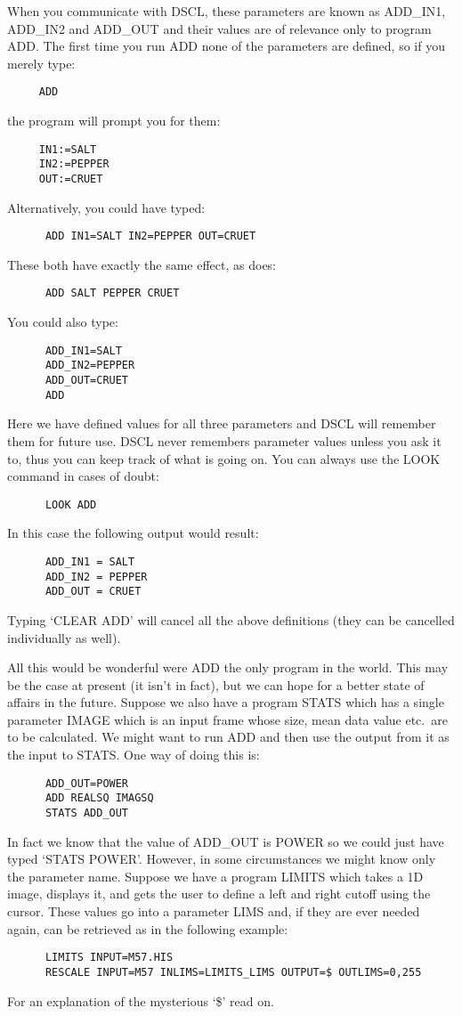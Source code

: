 When you communicate with DSCL, these parameters are known as ADD\_IN1, ADD\_IN2
and ADD\_OUT and their values are of relevance only to program ADD.
The first time you run ADD none of the parameters are defined, so if you
merely type:
\begin{verbatim}
     ADD
\end{verbatim}
the program will prompt you for them:
\begin{verbatim}
     IN1:=SALT
     IN2:=PEPPER
     OUT:=CRUET
\end{verbatim}
Alternatively, you could have typed:
\begin{verbatim}
      ADD IN1=SALT IN2=PEPPER OUT=CRUET
\end{verbatim}
These both have exactly the same effect, as does:
\begin{verbatim}
      ADD SALT PEPPER CRUET
\end{verbatim}
You could also type:
\begin{verbatim}
      ADD_IN1=SALT
      ADD_IN2=PEPPER
      ADD_OUT=CRUET
      ADD
\end{verbatim}
Here we have defined values for all three parameters and DSCL will remember
them for future use.
DSCL never remembers parameter values unless you ask it to, thus you can keep
track of what is going on.
You can always use the LOOK command in cases of doubt:
\begin{verbatim}
      LOOK ADD
\end{verbatim}
In this case the following output would result:
\begin{verbatim}
      ADD_IN1 = SALT
      ADD_IN2 = PEPPER
      ADD_OUT = CRUET
\end{verbatim}
Typing `CLEAR ADD' will cancel all the above definitions (they can be cancelled
individually as well).

All this would be wonderful were ADD the only program in the world.
This may be the case at present (it isn't in fact), but we can hope for a
better state of affairs in the future.
Suppose we also have a program STATS which has a single parameter IMAGE which
is an input frame whose size, mean data value etc.\ are to be calculated.
We might want to run ADD and then use the output from it as the input to STATS.
One way of doing this is:
\begin{verbatim}
      ADD_OUT=POWER
      ADD REALSQ IMAGSQ
      STATS ADD_OUT
\end{verbatim}
In fact we know that the value of ADD\_OUT is POWER so we could just have typed
`STATS POWER'.
However, in some circumstances we might know only the parameter name.
Suppose we have a program LIMITS which takes a 1D image, displays it, and gets
the user to define a left and right cutoff using the cursor.
These values go into a parameter LIMS and, if they are ever needed again, can be
retrieved as in the following example:
\begin{verbatim}
      LIMITS INPUT=M57.HIS
      RESCALE INPUT=M57 INLIMS=LIMITS_LIMS OUTPUT=$ OUTLIMS=0,255
\end{verbatim}
For an explanation of the mysterious `\$' read on.
